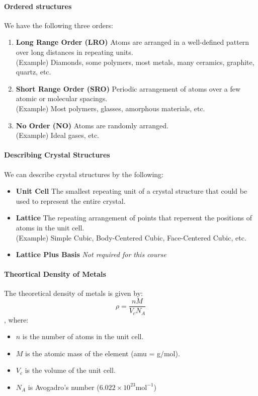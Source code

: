 \documentclass[11pt]{report}
\begin{document}
\paragraph{Ordered structures} We have the following three orders:
\begin{enumerate}
    \item \textbf{Long Range Order (LRO)} Atoms are arranged in a well-defined pattern over long distances in repeating units. \\
    (Example) Diamonds, some polymers, most metals, many ceramics, graphite, quartz, etc.
    \item \textbf{Short Range Order (SRO)} Periodic arrangement of atoms over a few atomic or molecular spacings. \\
    (Example) Most polymers, glasses, amorphous materials, etc.
    \item \textbf{No Order (NO)} Atoms are randomly arranged. \\
    (Example) Ideal gases, etc.
\end{enumerate}
\paragraph{Describing Crystal Structures} We can describe crystal structures by the following:
\begin{itemize}
    \item \textbf{Unit Cell} The smallest repeating unit of a crystal structure that could be used to represent the entire crystal.
    \item \textbf{Lattice} The repeating arrangement of points that repersent the positions of atoms in the unit cell.\\
    (Example) Simple Cubic, Body-Centered Cubic, Face-Centered Cubic, etc.
    \item \textbf{Lattice Plus Basis} \textit{Not required for this course}
\end{itemize}
\paragraph{Theortical Density of Metals} The theoretical density of metals is given by:
\begin{equation} \label{eq:theoretical-density}
    \rho = \frac{nM}{V_c N_A}
\end{equation}
, where:
\begin{itemize}
    \item $n$ is the number of atoms in the unit cell.
    \item $M$ is the atomic mass of the element (amu = g/mol).
    \item $V_c$ is the volume of the unit cell.
    \item $N_A$ is Avogadro's number ($6.022 \times 10^{23} \text{mol}^{-1}$)
\end{itemize}
\end{document}
